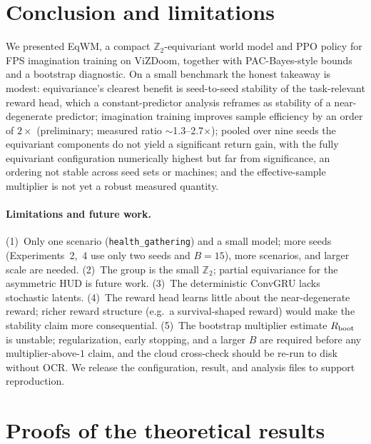 \documentclass[sigconf,anonymous]{acmart}
\begin{document}
\section{Conclusion and limitations}\label{sec:concl}
We presented EqWM, a compact $\mathbb Z_2$-equivariant world model and PPO
policy for FPS imagination training on ViZDoom, together with PAC-Bayes-style
bounds and a bootstrap diagnostic. On a small benchmark the honest takeaway
is modest: equivariance's clearest benefit is seed-to-seed stability of the
task-relevant reward head, which a constant-predictor analysis reframes as
stability of a near-degenerate predictor; imagination training improves
sample efficiency by an order of $2\times$ (preliminary; measured ratio
$\sim$1.3--2.7$\times$); pooled over nine seeds the equivariant components do
not yield a significant return gain, with the fully equivariant configuration
numerically highest but far from significance, an ordering not stable across
seed sets or machines; and the effective-sample
multiplier is not yet a robust measured quantity.

\paragraph{Limitations and future work.}
(1)~Only one scenario (\texttt{health\_gathering}) and a small model; more
seeds (Experiments~2,~4 use only two seeds and $B=15$), more scenarios, and
larger scale are needed. (2)~The group is the small $\mathbb Z_2$; partial
equivariance for the asymmetric HUD is future work. (3)~The deterministic
ConvGRU lacks stochastic latents. (4)~The reward head learns little about the
near-degenerate reward; richer reward structure (e.g.\ a survival-shaped
reward) would make the stability claim more consequential. (5)~The bootstrap
multiplier estimate $R_{\rm boot}$ is unstable; regularization, early
stopping, and a larger $B$ are required before any multiplier-above-$1$
claim, and the cloud cross-check should be re-run to disk without OCR. We
release the configuration, result, and analysis files to support reproduction.

\appendix
\section{Proofs of the theoretical results}\label{app:proofs}
\end{document}
